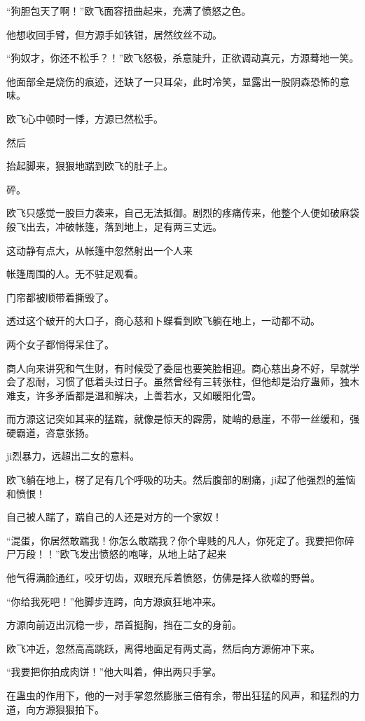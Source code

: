\begin{this_body}
“狗胆包天了啊！”欧飞面容扭曲起来，充满了愤怒之色。

他想收回手臂，但方源手如铁钳，居然纹丝不动。

“狗奴才，你还不松手？！”欧飞怒极，杀意陡升，正欲调动真元，方源蓦地一笑。

他面部全是烧伤的痕迹，还缺了一只耳朵，此时冷笑，显露出一股阴森恐怖的意味。

欧飞心中顿时一悸，方源已然松手。

然后

抬起脚来，狠狠地踹到欧飞的肚子上。

砰。

欧飞只感觉一股巨力袭来，自己无法抵御。剧烈的疼痛传来，他整个人便如破麻袋般飞出去，冲破帐篷，落到地上，足有两三丈远。

这动静有点大，从帐篷中忽然射出一个人来

帐篷周围的人。无不驻足观看。

门帘都被顺带着撕毁了。

透过这个破开的大口子，商心慈和卜蝶看到欧飞躺在地上，一动都不动。

两个女子都悄得呆住了。

商人向来讲究和气生财，有时候受了委屈也要笑脸相迎。商心慈出身不好，早就学会了忍耐，习惯了低着头过日子。虽然曾经有三转张柱，但他却是治疗蛊师，独木难支，许多矛盾都是温和解决，上善若水，又如暖阳化雪。

而方源这记突如其来的猛踹，就像是惊天的霹雳，陡峭的悬崖，不带一丝缓和，强硬霸道，咨意张扬。

ji烈暴力，远超出二女的意料。

欧飞躺在地上，楞了足有几个呼吸的功夫。然后腹部的剧痛，ji起了他强烈的羞恼和愤恨！

自己被人踹了，踹自己的人还是对方的一个家奴！

“混蛋，你居然敢踹我！你怎么敢踹我？你个卑贱的凡人，你死定了。我要把你碎尸万段！！”欧飞发出愤怒的咆哮，从地上站了起来

他气得满脸通红，咬牙切齿，双眼充斥着愤怒，仿佛是择人欲噬的野兽。

“你给我死吧！”他脚步连跨，向方源疯狂地冲来。

方源向前迈出沉稳一步，昂首挺胸，挡在二女的身前。

欧飞冲近，忽然高高跳跃，离得地面足有两丈高，然后向方源俯冲下来。

“我要把你拍成肉饼！”他大叫着，伸出两只手掌。

在蛊虫的作用下，他的一对手掌忽然膨胀三倍有余，带出狂猛的风声，和猛烈的力道，向方源狠狠拍下。


\end{this_body}
